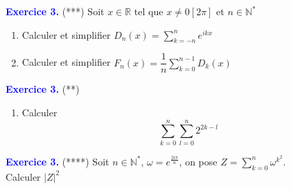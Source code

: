 \documentclass[a4paper,10pt]{article}
\begin{document}
\begin{multicols}{2}
\textcolor{blue}{\large{\bf Exercice 3.}} (***)
Soit $x \in \mathbb{R}$ tel que $x \neq 0 [2 \pi]$ et $n \in \mathbb{N}^{*}$
\begin{enumerate}
\item Calculer et simplifier $D_n(x) = \displaystyle\sum_{k=-n}^{n}{e^{ikx}}$
\item Calculer et simplifier $F_n(x) = \dfrac{1}{n} \displaystyle\sum_{k=0}^{n-1}{D_k(x)}$
\end{enumerate}

\textcolor{blue}{\large{\bf Exercice 3.}} (**)
\begin{enumerate}
\item Calculer $$\displaystyle\sum_{k=0}^{n}{\displaystyle\sum_{l=0}^{n}{2^{2k-l}}}$$
\end{enumerate}

\textcolor{blue}{\large{\bf Exercice 3.}} (****)
Soit $n \in \mathbb{N}^{*}$, $\omega = e^{\frac{2 i \pi}{n}}$, on pose $Z = \displaystyle\sum_{k=0}^{n}{\omega^{k^2}}$. \\
Calculer $|Z|^{2}$

\end{multicols}
\end{document}
